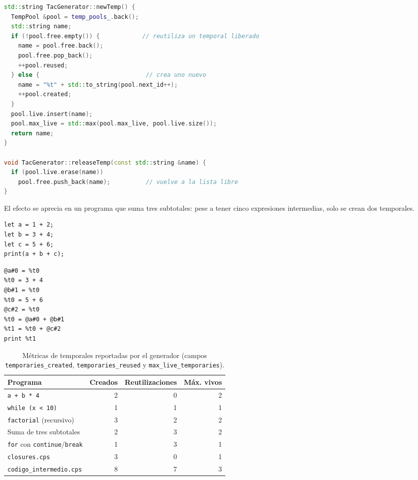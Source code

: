 \documentclass[11pt,a4paper]{article}
\begin{document}
\begin{lstlisting}[language=C++,caption={Asignación y reciclaje de temporales (\texttt{tac\_generator.cpp}, simplificado).}]
std::string TacGenerator::newTemp() {
  TempPool &pool = temp_pools_.back();
  std::string name;
  if (!pool.free.empty()) {            // reutiliza un temporal liberado
    name = pool.free.back();
    pool.free.pop_back();
    ++pool.reused;
  } else {                              // crea uno nuevo
    name = "%t" + std::to_string(pool.next_id++);
    ++pool.created;
  }
  pool.live.insert(name);
  pool.max_live = std::max(pool.max_live, pool.live.size());
  return name;
}

void TacGenerator::releaseTemp(const std::string &name) {
  if (pool.live.erase(name))
    pool.free.push_back(name);          // vuelve a la lista libre
}
\end{lstlisting}

El efecto se aprecia en un programa que suma tres subtotales: pese a tener cinco
expresiones intermedias, solo se crean dos temporales.

\noindent
\begin{minipage}[t]{0.40\textwidth}
\begin{lstlisting}[language=Compiscript,style=sinnumero]
let a = 1 + 2;
let b = 3 + 4;
let c = 5 + 6;
print(a + b + c);
\end{lstlisting}
\end{minipage}\hfill
\begin{minipage}[t]{0.54\textwidth}
\begin{lstlisting}[language=TAC,style=sinnumero]
%t0 = 1 + 2
@a#0 = %t0
%t0 = 3 + 4
@b#1 = %t0
%t0 = 5 + 6
@c#2 = %t0
%t0 = @a#0 + @b#1
%t1 = %t0 + @c#2
print %t1
\end{lstlisting}
\end{minipage}

\begin{table}[H]
\centering
\small
\begin{tabular}{@{}L{6.4cm}rrr@{}}
\toprule
\textbf{Programa} & \textbf{Creados} & \textbf{Reutilizaciones} & \textbf{Máx. vivos} \\
\midrule
\texttt{a + b * 4} & 2 & 0 & 2 \\
\texttt{while (x < 10)} & 1 & 1 & 1 \\
\texttt{factorial} (recursivo) & 3 & 2 & 2 \\
Suma de tres subtotales & 2 & 3 & 2 \\
\texttt{for} con \texttt{continue}/\texttt{break} & 1 & 3 & 1 \\
\texttt{closures.cps} & 3 & 0 & 1 \\
\texttt{codigo\_intermedio.cps} & 8 & 7 & 3 \\
\bottomrule
\end{tabular}
\caption{Métricas de temporales reportadas por el generador (campos
\texttt{temporaries\_created}, \texttt{temporaries\_reused} y
\texttt{max\_live\_temporaries}).}
\end{table}
\end{document}
